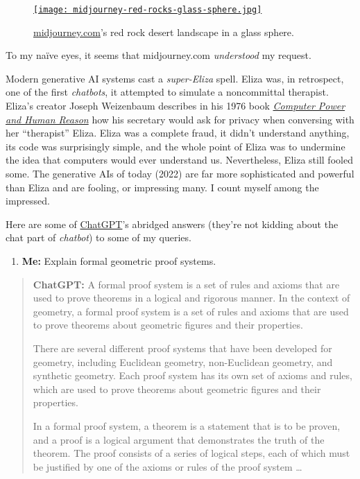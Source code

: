 \captionsetup[figure]{labelformat=empty}
\begin{figure}[htbp]
\centering
\href{https://conceptcontrol.smugmug.com/Themes/Manipulations/Artificial-Impressions/i-mXpfTK8/A}{\texttt{[image: midjourney-red-rocks-glass-sphere.jpg]}}
\caption[\href{https://midjourney.com}{midjourney.com} red rock desert in glass a sphere]{\href{https://midjourney.com}{midjourney.com}'s red rock desert landscape in a glass sphere.}
\label{fig:7681x1}
\end{figure}

To my naïve eyes, it seems that midjourney.com \emph{understood} my
request.

Modern generative AI systems cast a \emph{super-Eliza} spell. Eliza was,
in retrospect, one of the first \emph{chatbots}, it attempted to
simulate a noncommittal therapist. Eliza's creator Joseph Weizenbaum
describes in his 1976 book
\emph{\href{https://www.amazon.com/Computer-Power-Human-Reason-Calculation/dp/0716704633}{Computer
Power and Human Reason}} how his secretary would ask for privacy when
conversing with her ``therapist'' Eliza. Eliza was a complete fraud, it
didn't understand anything, its code was surprisingly simple, and the
whole point of Eliza was to undermine the idea that computers would ever
understand us. Nevertheless, Eliza still fooled some. The generative AIs
of today (2022) are far more sophisticated and powerful than Eliza and
are fooling, or impressing many. I count myself among the impressed.

Here are some of \href{https://openai.com/blog/chatgpt/}{ChatGPT}'s
abridged answers (they're not kidding about the chat part of
\emph{chatbot}) to some of my queries.

\begin{enumerate}
\def\labelenumi{\arabic{enumi}.}
\item
  \textbf{Me:} Explain formal geometric proof systems.
\end{enumerate}

\begin{quote}
\textbf{ChatGPT:} A formal proof system is a set of rules and axioms
that are used to prove theorems in a logical and rigorous manner. In the
context of geometry, a formal proof system is a set of rules and axioms
that are used to prove theorems about geometric figures and their
properties.

There are several different proof systems that have been developed for
geometry, including Euclidean geometry, non-Euclidean geometry, and
synthetic geometry. Each proof system has its own set of axioms and
rules, which are used to prove theorems about geometric figures and
their properties.

In a formal proof system, a theorem is a statement that is to be proven,
and a proof is a logical argument that demonstrates the truth of the
theorem. The proof consists of a series of logical steps, each of which
must be justified by one of the axioms or rules of the proof system
\ldots{}
\end{quote}

